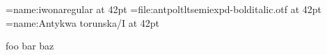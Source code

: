 
\font\first=name:iwonaregular at 42pt
\font\second=file:antpoltltsemiexpd-bolditalic.otf at 42pt
\font\third={name:Antykwa torunska/I} at 42pt

{\first   foo \endgraf}
{\second  bar \endgraf}
{\third   baz \endgraf}

\bye

